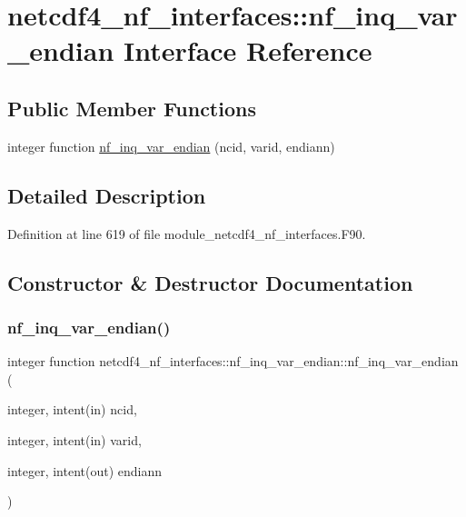 \hypertarget{interfacenetcdf4__nf__interfaces_1_1nf__inq__var__endian}{}\section{netcdf4\+\_\+nf\+\_\+interfaces\+:\+:nf\+\_\+inq\+\_\+var\+\_\+endian Interface Reference}
\label{interfacenetcdf4__nf__interfaces_1_1nf__inq__var__endian}
\subsection*{Public Member Functions}
\begin{DoxyCompactItemize}
\item 
integer function \hyperlink{interfacenetcdf4__nf__interfaces_1_1nf__inq__var__endian_a7878cf8e4c9b6b2687d1502c447c17cc}{nf\+\_\+inq\+\_\+var\+\_\+endian} (ncid, varid, endiann)
\end{DoxyCompactItemize}


\subsection{Detailed Description}


Definition at line 619 of file module\+\_\+netcdf4\+\_\+nf\+\_\+interfaces.\+F90.



\subsection{Constructor \& Destructor Documentation}
\mbox{\label{interfacenetcdf4__nf__interfaces_1_1nf__inq__var__endian_a7878cf8e4c9b6b2687d1502c447c17cc}} 
\subsubsection{\texorpdfstring{nf\+\_\+inq\+\_\+var\+\_\+endian()}{nf\_inq\_var\_endian()}}
{\footnotesize\ttfamily integer function netcdf4\+\_\+nf\+\_\+interfaces\+::nf\+\_\+inq\+\_\+var\+\_\+endian\+::nf\+\_\+inq\+\_\+var\+\_\+endian (\begin{DoxyParamCaption}\item[{integer, intent(in)}]{ncid,  }\item[{integer, intent(in)}]{varid,  }\item[{integer, intent(out)}]{endiann }\end{DoxyParamCaption})}



